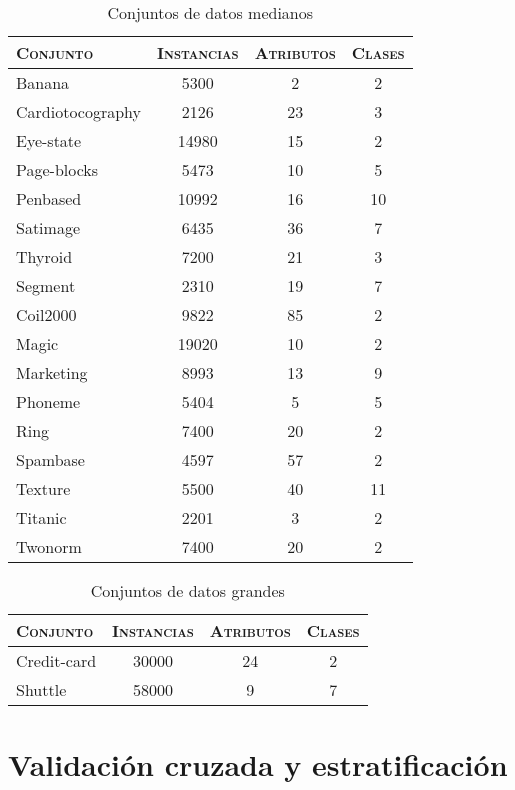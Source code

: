\begin{table}[]
\centering
\begin{tabular}{l c c c}
\hline
\textsc{Conjunto} & \textsc{Instancias} & \textsc{Atributos} & \textsc{Clases} \\
\hline
\hline

Banana           &  5300 &  2 & 2 \\
Cardiotocography &  2126 & 23 & 3 \\
Eye-state        & 14980 & 15 & 2 \\
Page-blocks      &  5473 & 10 & 5 \\
Penbased         & 10992 & 16 & 10 \\
Satimage         &  6435 & 36 & 7 \\
Thyroid          &  7200 & 21 & 3 \\
Segment          &  2310 & 19 & 7 \\
Coil2000         &  9822 & 85 & 2 \\
Magic            & 19020 & 10 & 2 \\
Marketing        &  8993 & 13 & 9 \\
Phoneme          &  5404 & 5  & 5 \\
Ring             &  7400 & 20 & 2 \\
Spambase         &  4597 & 57 & 2 \\
Texture          &  5500 & 40 & 11 \\
Titanic          &  2201 &  3 & 2  \\
Twonorm          &  7400 & 20 & 2 \\

\hline
\end{tabular}
\caption{Conjuntos de datos medianos}
\label{medianos}
\end{table}

\begin{table}[]
\centering
\begin{tabular}{l c c c}
\hline
\textsc{Conjunto} & \textsc{Instancias} & \textsc{Atributos} & \textsc{Clases} \\
\hline
\hline

Credit-card      & 30000 & 24 & 2 \\
Shuttle          & 58000 & 9  & 7 \\

\hline
\end{tabular}
\caption{Conjuntos de datos grandes}
\label{grandes}
\end{table}

\section{Validación cruzada y estratificación}

